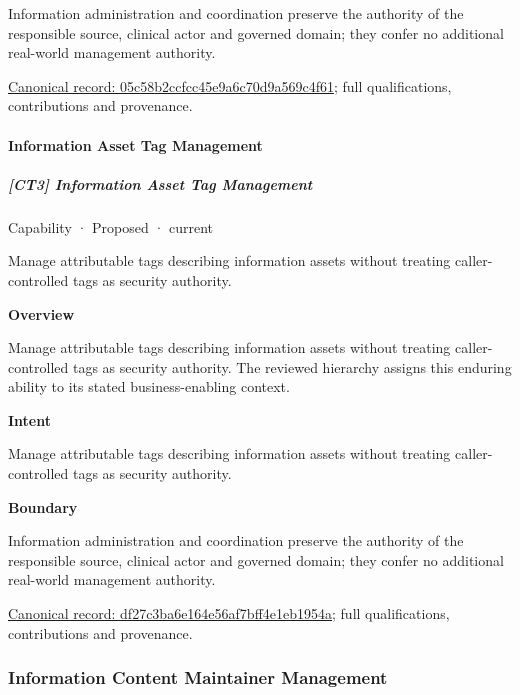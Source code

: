 Information administration and coordination preserve the authority of the responsible source, clinical actor and governed domain; they confer no additional real-world management authority.


{\footnotesize \href{../../../../continuum/strategy/capability/05c58b2ccfcc45e9a6c70d9a569c4f61.md}{Canonical record: 05c58b2ccfcc45e9a6c70d9a569c4f61}; full qualifications, contributions and provenance.}\par
\paragraph{Information Asset Tag Management}

\subparagraph{[CT3] Information Asset Tag Management}

\label{element:df27c3ba6e164e56af7bff4e1eb1954a}
{\small Capability · Proposed · current}\par

Manage attributable tags describing information assets without treating caller-controlled tags as security authority.



\textbf{Overview}



Manage attributable tags describing information assets without treating caller-controlled tags as security authority. The reviewed hierarchy assigns this enduring ability to its stated business-enabling context.



\textbf{Intent}



Manage attributable tags describing information assets without treating caller-controlled tags as security authority.



\textbf{Boundary}



Information administration and coordination preserve the authority of the responsible source, clinical actor and governed domain; they confer no additional real-world management authority.


{\footnotesize \href{../../../../continuum/strategy/capability/df27c3ba6e164e56af7bff4e1eb1954a.md}{Canonical record: df27c3ba6e164e56af7bff4e1eb1954a}; full qualifications, contributions and provenance.}\par
\subsubsection{Information Content Maintainer Management}

